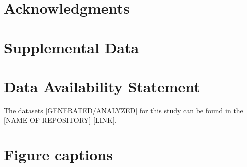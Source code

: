 \documentclass[utf8]{frontiersSCNS} %
\begin{document}
\section*{Acknowledgments}

\section*{Supplemental Data}

\section*{Data Availability Statement}
The datasets [GENERATED/ANALYZED] for this study can be found in the [NAME OF REPOSITORY] [LINK].




\section*{Figure captions}

\end{document}
